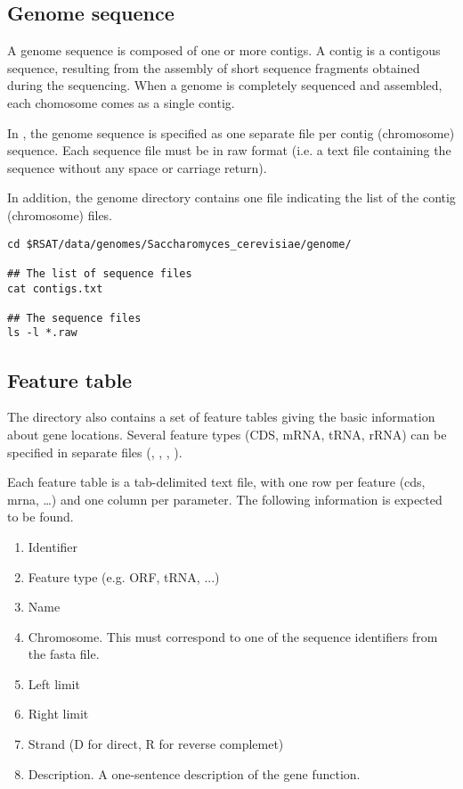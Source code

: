 \subsection{Genome sequence} 

A genome sequence is composed of one or more contigs. A contig is a
contigous sequence, resulting from the assembly of short sequence
fragments obtained during the sequencing. When a genome is completely
sequenced and assembled, each chomosome comes as a single contig. 

In \RSAT, the genome sequence is specified as one separate file per
contig (chromosome) sequence. Each sequence file must be in raw format
(i.e. a text file containing the sequence without any space or
carriage return). 

In addition, the genome directory contains one file indicating the
list of the contig (chromosome) files.

\begin{footnotesize}
\begin{verbatim}
cd $RSAT/data/genomes/Saccharomyces_cerevisiae/genome/

## The list of sequence files
cat contigs.txt

## The sequence files
ls -l *.raw

\end{verbatim}
\end{footnotesize}

\subsection{Feature table}

The  directory also contains a set of feature tables
giving the basic information about gene locations. Several feature
types (CDS, mRNA, tRNA, rRNA) can be specified in separate files
(, , , ).

Each feature table is a tab-delimited text file, with one row per
feature (cds, mrna, \ldots) and one column per parameter. The
following information is expected to be found.

\begin{enumerate}

\item Identifier

\item Feature type (e.g. ORF, tRNA, ...)

\item Name

\item Chromosome. This must correspond to one of the sequence
identifiers from the fasta file.

\item Left limit

\item Right limit

\item Strand (D for direct, R for reverse complemet)

\item Description. A one-sentence description of the gene function.

\end{enumerate}


